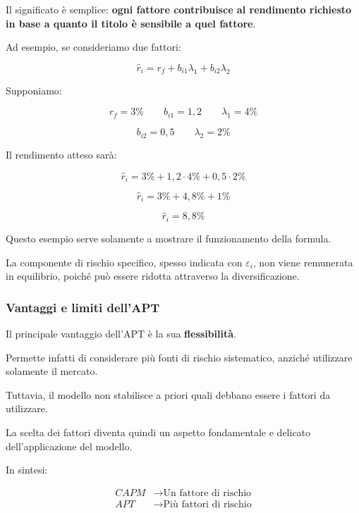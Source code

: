 \noindent Il significato è semplice:
\textbf{ogni fattore contribuisce al rendimento
richiesto in base a quanto il titolo è sensibile
a quel fattore}.

\medskip

\noindent Ad esempio, se consideriamo due fattori:

\[
\hat{r}_i=
r_f+b_{i1}\lambda_1+b_{i2}\lambda_2
\]

\noindent Supponiamo:

\[
r_f=3\%
\qquad
b_{i1}=1{,}2
\qquad
\lambda_1=4\%
\]

\[
b_{i2}=0{,}5
\qquad
\lambda_2=2\%
\]

\noindent Il rendimento atteso sarà:

\[
\hat{r}_i=3\%+1{,}2\cdot4\%+0{,}5\cdot2\%
\]

\[
\hat{r}_i=3\%+4{,}8\%+1\%
\]

\[
\boxed{\hat{r}_i=8{,}8\%}
\]

\noindent Questo esempio serve solamente
a mostrare il funzionamento della formula.

\medskip

\noindent La componente di rischio specifico,
spesso indicata con $\varepsilon_i$,
non viene remunerata in equilibrio,
poiché può essere ridotta attraverso
la diversificazione.


\subsubsection*{Vantaggi e limiti dell'APT}

\noindent Il principale vantaggio dell'APT
è la sua \textbf{flessibilità}.

\medskip

\noindent Permette infatti di considerare
più fonti di rischio sistematico,
anziché utilizzare solamente il mercato.

\medskip

\noindent Tuttavia, il modello non stabilisce
a priori quali debbano essere
i fattori da utilizzare.

\medskip

\noindent La scelta dei fattori diventa quindi
un aspetto fondamentale e delicato
dell'applicazione del modello.

\medskip

\noindent In sintesi:

\[
\boxed{
\begin{aligned}
CAPM&\rightarrow\text{Un fattore di rischio}\\
APT&\rightarrow\text{Più fattori di rischio}
\end{aligned}
}
\]


